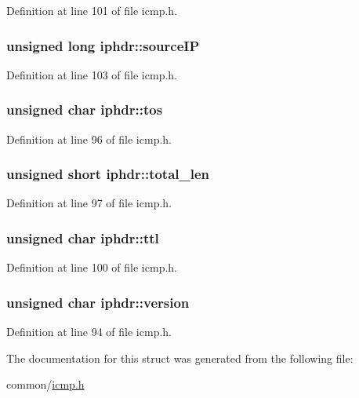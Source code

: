 \-Definition at line 101 of file icmp.\-h.

\hypertarget{structiphdr_acb14e7dce69ddfa7895bb42c4268059e}{
\subsubsection[{source\-I\-P}]{\setlength{\rightskip}{0pt plus 5cm}unsigned long {\bf iphdr\-::source\-I\-P}}}\label{structiphdr_acb14e7dce69ddfa7895bb42c4268059e}


\-Definition at line 103 of file icmp.\-h.

\hypertarget{structiphdr_a2efd9259c6f056707ceb0ae5bae5c90f}{
\subsubsection[{tos}]{\setlength{\rightskip}{0pt plus 5cm}unsigned char {\bf iphdr\-::tos}}}\label{structiphdr_a2efd9259c6f056707ceb0ae5bae5c90f}


\-Definition at line 96 of file icmp.\-h.

\hypertarget{structiphdr_abb34ffd5b3f3ea01b6981beda60359b6}{
\subsubsection[{total\-\_\-len}]{\setlength{\rightskip}{0pt plus 5cm}unsigned short {\bf iphdr\-::total\-\_\-len}}}\label{structiphdr_abb34ffd5b3f3ea01b6981beda60359b6}


\-Definition at line 97 of file icmp.\-h.

\hypertarget{structiphdr_acf6d9c663bfb22293ce2fadec78b7c9a}{
\subsubsection[{ttl}]{\setlength{\rightskip}{0pt plus 5cm}unsigned char {\bf iphdr\-::ttl}}}\label{structiphdr_acf6d9c663bfb22293ce2fadec78b7c9a}


\-Definition at line 100 of file icmp.\-h.

\hypertarget{structiphdr_a232d177bba2eefdbab013bed9f8faf5d}{
\subsubsection[{version}]{\setlength{\rightskip}{0pt plus 5cm}unsigned char {\bf iphdr\-::version}}}\label{structiphdr_a232d177bba2eefdbab013bed9f8faf5d}


\-Definition at line 94 of file icmp.\-h.



\-The documentation for this struct was generated from the following file\-:\begin{DoxyCompactItemize}
\item 
common/\hyperlink{icmp_8h}{icmp.\-h}\end{DoxyCompactItemize}
